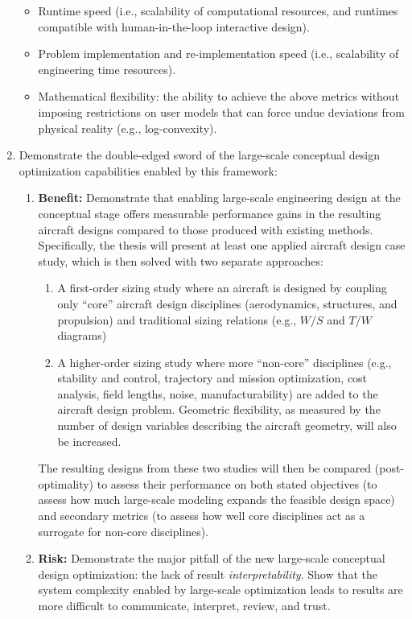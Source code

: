 \documentclass[12pt,vi,oneside]{report}
\begin{document}
\begin{enumerate}
        \begin{itemize}
            \item Runtime speed (i.e., scalability of computational resources, and runtimes compatible with human-in-the-loop interactive design).
            \item Problem implementation and re-implementation speed (i.e., scalability of engineering time resources).
            \item Mathematical flexibility: the ability to achieve the above metrics without imposing restrictions on user models that can force undue deviations from physical reality (e.g., log-convexity).
        \end{itemize}
        \item Demonstrate the double-edged sword of the large-scale conceptual design optimization capabilities enabled by this framework:
        \begin{enumerate}
            \item \textbf{Benefit:} Demonstrate that enabling large-scale engineering design at the conceptual stage offers measurable performance gains in the resulting aircraft designs compared to those produced with existing methods. Specifically, the thesis will present at least one applied aircraft design case study, which is then solved with two separate approaches:
            \begin{enumerate}
                \item A first-order sizing study where an aircraft is designed by coupling only ``core'' aircraft design disciplines (aerodynamics, structures, and propulsion) and traditional sizing relations (e.g., $W/S$ and $T/W$ diagrams)
                \item A higher-order sizing study where more ``non-core'' disciplines (e.g., stability and control, trajectory and mission optimization, cost analysis, field lengths, noise, manufacturability) are added to the aircraft design problem. Geometric flexibility, as measured by the number of design variables describing the aircraft geometry, will also be increased.
            \end{enumerate}
            The resulting designs from these two studies will then be compared (post-optimality) to assess their performance on both stated objectives (to assess how much large-scale modeling expands the feasible design space) and secondary metrics (to assess how well core disciplines act as a surrogate for non-core disciplines).
            \item \textbf{Risk:} Demonstrate the major pitfall of the new large-scale conceptual design optimization: the lack of result \textit{interpretability}. Show that the system complexity enabled by large-scale optimization leads to results are more difficult to communicate, interpret, review, and trust.

\end{enumerate}
\end{enumerate}
\end{document}
